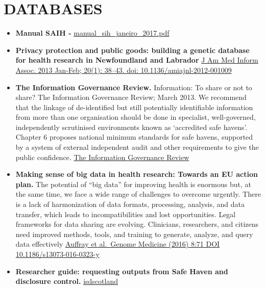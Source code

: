 \documentclass[]{book}
\begin{document}
\hypertarget{databases}{%
\section*{DATABASES}\label{databases}}

\begin{itemize}
\item
  \textbf{Manual SAIH - } \href{http://www.saude.sp.gov.br/resources/ses/perfil/gestor/homepage/auditoria/manuais/manual_sih_janeiro_2017.pdf}{manual\_sih\_janeiro\_2017.pdf}
\item
  \textbf{Privacy protection and public goods: building a genetic database for health research in Newfoundland and Labrador} \href{https://www.ncbi.nlm.nih.gov/pmc/articles/PMC3555321/}{J Am Med Inform Assoc. 2013 Jan-Feb; 20(1): 38--43. doi: 10.1136/amiajnl-2012-001009}
\item
  \textbf{The Information Governance Review.} Information: To share or not to share? The Information Governance Review; March 2013. We recommend that the linkage of de-identified but still potentially identifiable information from more than one organisation should be done in specialist, well-governed, independently scrutinised environments known as `accredited safe havens'. Chapter 6 proposes national minimum standards for safe havens, supported by a system of external independent audit and other requirements to give the public confidence. \href{https://assets.publishing.service.gov.uk/government/uploads/system/uploads/attachment_data/file/192572/2900774_InfoGovernance_accv2.pdf}{The Information Governance Review}
\item
  \textbf{Making sense of big data in health research: Towards an EU action plan.} The potential of ``big data'' for improving health is enormous but, at the same time, we face a wide range of challenges to overcome urgently. There is a lack of harmonization of data formats, processing, analysis, and data transfer, which leads to incompatibilities and lost opportunities. Legal frameworks for data sharing are evolving. Clinicians, researchers, and citizens need improved methods, tools, and training to generate, analyze, and query data effectively \href{https://genomemedicine.biomedcentral.com/track/pdf/10.1186/s13073-016-0323-y}{Auffray et al.~Genome Medicine (2016) 8:71 DOI 10.1186/s13073-016-0323-y}
\item
  \textbf{Researcher guide: requesting outputs from Safe Haven and disclosure control.} \href{https://www.isdscotland.org/Products-and-Services/EDRIS/_docs/Researcher-guide-to-disclosure-control-V1-2.pdf}{isdscotland}

\end{itemize}
\end{document}
